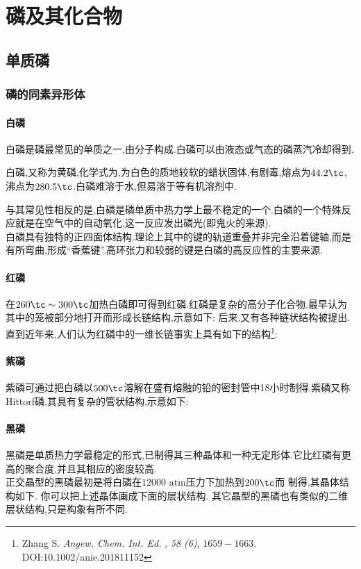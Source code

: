 \documentclass{ctexart}
\begin{document}
\section{磷及其化合物}
\subsection{单质磷}
\subsubsection{磷的同素异形体}
\paragraph{白磷}
白磷是磷最常见的单质之一,由分子构成.白磷可以由液态或气态的磷蒸汽冷却得到.
\begin{substance}[\ce{P4}]
    白磷,又称为黄磷,化学式为,为白色的质地较软的蜡状固体,有剧毒,熔点为$44.2\tc$,沸点为$280.5\tc$.白磷难溶于水,但易溶于等有机溶剂中.
\end{substance}
与其常见性相反的是,白磷是磷单质中热力学上最不稳定的一个.白磷的一个特殊反应就是在空气中的自动氧化,这一反应发出磷光(即鬼火的来源).\\
\indent 白磷具有独特的正四面体结构.理论上其中的键的轨道重叠并非完全沿着键轴,而是有所弯曲,形成“香蕉键”.高环张力和较弱的键是白磷的高反应性的主要来源.
\paragraph{红磷}
在$260\tc\sim300\tc$加热白磷即可得到红磷.红磷是复杂的高分子化合物.最早认为其中的笼被部分地打开而形成长链结构,示意如下:
后来,又有各种链状结构被提出.直到近年来,人们认为红磷中的一维长链事实上具有如下的结构\footnote{
Zhang S. \textit{Angew. Chem. Int. Ed.} , \textit{58 (6)}, $1659-1663$.
DOI:10.1002/anie.201811152}:

\paragraph{紫磷}
紫磷可通过把白磷以$500\tc$溶解在盛有熔融的铅的密封管中18小时制得.紫磷又称Hittorf磷,其具有复杂的管状结构,示意如下:
\paragraph{黑磷}
黑磷是单质热力学最稳定的形式,已制得其三种晶体和一种无定形体.它比红磷有更高的聚合度,并且其相应的密度较高.\\
\indent 正交晶型的黑磷最初是将白磷在$12000\text{ atm}$压力下加热到$200\tc$而
制得,其晶体结构如下.
\noindent 你可以把上述晶体画成下面的层状结构.
\noindent 其它晶型的黑磷也有类似的二维层状结构,只是构象有所不同.
\end{document}
